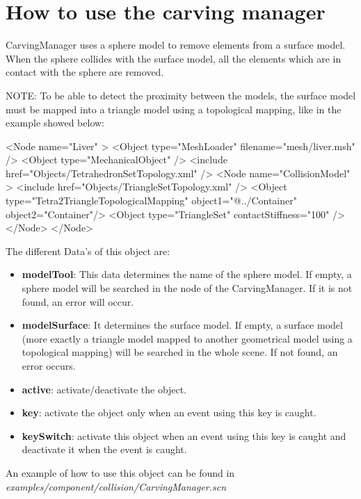 \section{How to use the carving manager}

CarvingManager uses a sphere model to remove elements from a surface model. When the sphere collides with the surface model, all the elements which are in contact with the sphere are removed.

NOTE: To be able to detect the proximity between the models, the surface model must be mapped into a triangle model using a topological mapping, like in the example showed below:

\begin{code_xml}
	<Node name="Liver" >
		<Object type="MeshLoader" filename="mesh/liver.msh" />
		<Object type="MechanicalObject" />
		<include href="Objects/TetrahedronSetTopology.xml" />
		<Node name="CollisionModel" >
			<include href="Objects/TriangleSetTopology.xml" />
        		<Object type="Tetra2TriangleTopologicalMapping" object1="@../Container" 
				object2="Container"/>
			<Object type="TriangleSet" contactStiffness="100" />
		</Node>
	</Node>
\end{code_xml}

The different Data's of this object are:

\begin{itemize}
\item \textbf{modelTool}: This data determines the name of the sphere model. If empty, a sphere model will be searched in the node of the CarvingManager. If it is not found, an error will occur.
\item \textbf{modelSurface}: It determines the surface model. If empty, a surface model (more exactly a triangle model mapped to another geometrical model using a topological mapping) will be searched in the whole scene. If not found, an error occurs.
\item \textbf{active}: activate/deactivate the object.
\item \textbf{key}: activate the object only when an event using this key is caught.
\item \textbf{keySwitch}: activate this object when an event using this key is caught and deactivate it when the event is caught.
\end{itemize}

An example of how to use this object can be found in \textit{examples/component/collision/CarvingManager.scn}
